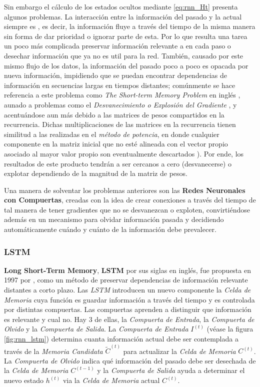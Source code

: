 Sin embargo el cálculo de los estados ocultos mediante \ref{eq:rnn_Ht} presenta algunos problemas.
La interacción entre la información del pasado y la actual siempre es , es decir, la información
fluye a través del tiempo de la misma manera sin forma de dar prioridad o ignorar parte de
esta. Por lo que resulta una tarea un poco más complicada preservar información relevante a en cada paso
o desechar información que ya no es util para la red. También, causado por este mismo flujo de los
datos, la información del pasado poco a poco es opacada por nueva información, impidiendo que se
puedan encontrar dependencias de información en secuencias largas en tiempos distantes;
comúnmente se hace referencia a este problema como \textit{The Short-term Memory Problem} en inglés
\cite{VanishinGradient2}, aunado a problemas como el
\textit{Desvanecimiento o Explosión del Gradiente} \cite{VanishinGradient} \cite{pmlr-v28-pascanu13},
y acentuándose aun más
debido a las matrices de pesos compartidos en la recurrencia. Dichas
multiplicaciones de las matrices en la recurrencia tienen similitud a las realizadas en el
\textit{método de potencia}, en donde cualquier
componente en la matriz inicial que no esté alineada con el vector propio asociado al mayor valor
propio son eventualmente descartados \cite[pp.~390-392]{GoodBengCour16}). Por ende, los resultados
de este producto tendrán a ser cercanos a cero (desvanecerse) o explotar dependiendo de la magnitud
de la matriz de pesos.

Una manera de solventar los problemas anteriores son las \textbf{Redes Neuronales con Compuertas},
creadas con la idea de crear conexiones a través del tiempo de tal manera de tener gradientes que no
se desvanezcan o exploten, convirtiéndose además en un mecanismo para olvidar información pasada y
decidiendo automáticamente cuándo y cuánto de la información debe prevalecer.

\subsubsection{LSTM}

\textbf{Long Short-Term Memory}, \textbf{LSTM} por sus siglas en inglés, fue propuesta en 1997 por
\citeauthor{LSTM}, como un método de preservar dependencias de información relevante
distantes a corto plazo. Las \textit{LSTM} introducen un nuevo componente la
\textit{Celda de Memoria} cuya función es guardar información a través del tiempo y es
controlada por distintas compuertas. Las compuertas aprenden a distinguir que información es relevante y
cual no. Hay 3 de ellas, la \textit{Compuerta de Entrada}, la \textit{Compuerta de Olvido}
y la \textit{Compuerta de Salida}. La \textit{Compuerta de Entrada} $I^{(t)}$ (véase la figura
\ref{fig:rnn_lstm}) determina cuanta información actual debe ser contemplada a través de la
\textit{Memoria Candidata} $\tilde C^{(t)}$ para actualizar la \textit{Celda de Memoria} $C^{(t)}$.
La \textit{Compuerta de Olvido} indica qué información del pasado debe ser desechada de la
\textit{Celda de Memoria} $C^{(t-1)}$ y la \textit{Compuerta de Salida} ayuda a determinar el nuevo
estado $h^{(t)}$ via la \textit{Celda de Memoria} actual $C^{(t)}$.

